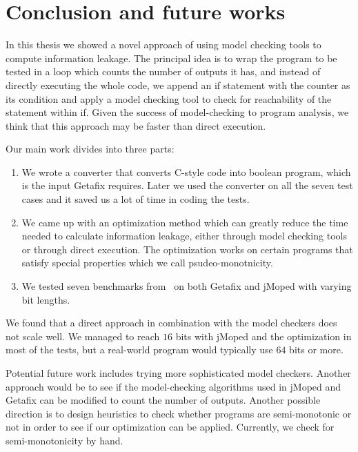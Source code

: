 
\chapter{Conclusion and future works}
	\label{CH_summary}

In this thesis we showed a novel approach of using model checking tools to compute information leakage. The principal idea is to wrap the program to be tested in a loop which counts the number of outputs it has, and instead of directly executing the whole code, we append an if statement with the counter as its condition and apply a model checking tool to check for reachability of the statement within if. Given the success of model-checking to program analysis, we think that this approach may be faster than direct execution.

Our main work divides into three parts:
\begin{enumerate}
\item We wrote a converter that converts C-style code into boolean program, which is the input Getafix requires. Later we used the converter on all the seven test cases and it saved us a lot of time in coding the tests. 
\item We came up with an optimization method which can greatly reduce the time needed to calculate information leakage, either through model checking tools or through direct execution. The optimization works on certain programs that satisfy special properties which we call psudeo-monotnicity. 

\item We tested seven benchmarks from~\cite{Smith} on both Getafix and jMoped with varying bit lengths.
\end{enumerate}

We found that a direct approach in combination with the model checkers does not scale well. We managed to reach $16$ bits with jMoped and the optimization in most of the tests, but a real-world program would typically use $64$ bits or more. 


Potential future work includes trying more sophisticated model checkers. Another approach would be to see if the model-checking algorithms  used in jMoped and Getafix can be modified to count the number of outputs. Another possible direction is to design heuristics to check whether programs are semi-monotonic or not in order to see if our optimization can be applied. Currently, we check for semi-monotonicity by hand. 